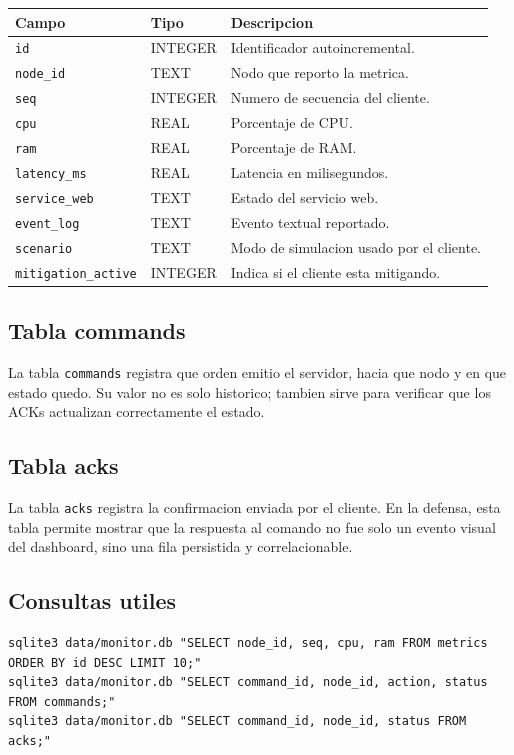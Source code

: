 \documentclass[11pt,letterpaper]{article}
\begin{document}
\begin{longtable}{|p{}|p{}|p{}|}
\hline
\textbf{Campo} & \textbf{Tipo} & \textbf{Descripcion} \\
\hline
\texttt{id} & INTEGER & Identificador autoincremental. \\
\hline
\texttt{node\_id} & TEXT & Nodo que reporto la metrica. \\
\hline
\texttt{seq} & INTEGER & Numero de secuencia del cliente. \\
\hline
\texttt{cpu} & REAL & Porcentaje de CPU. \\
\hline
\texttt{ram} & REAL & Porcentaje de RAM. \\
\hline
\texttt{latency\_ms} & REAL & Latencia en milisegundos. \\
\hline
\texttt{service\_web} & TEXT & Estado del servicio web. \\
\hline
\texttt{event\_log} & TEXT & Evento textual reportado. \\
\hline
\texttt{scenario} & TEXT & Modo de simulacion usado por el cliente. \\
\hline
\texttt{mitigation\_active} & INTEGER & Indica si el cliente esta mitigando. \\
\hline
\end{longtable}

\subsection{Tabla commands}

La tabla \texttt{commands} registra que orden emitio el servidor, hacia que nodo
y en que estado quedo. Su valor no es solo historico; tambien sirve para verificar
que los ACKs actualizan correctamente el estado.

\subsection{Tabla acks}

La tabla \texttt{acks} registra la confirmacion enviada por el cliente. En la
defensa, esta tabla permite mostrar que la respuesta al comando no fue solo un
evento visual del dashboard, sino una fila persistida y correlacionable.

\subsection{Consultas utiles}

\begin{lstlisting}[style=terminal]
sqlite3 data/monitor.db "SELECT node_id, seq, cpu, ram FROM metrics ORDER BY id DESC LIMIT 10;"
sqlite3 data/monitor.db "SELECT command_id, node_id, action, status FROM commands;"
sqlite3 data/monitor.db "SELECT command_id, node_id, status FROM acks;"
\end{lstlisting}
\end{document}
